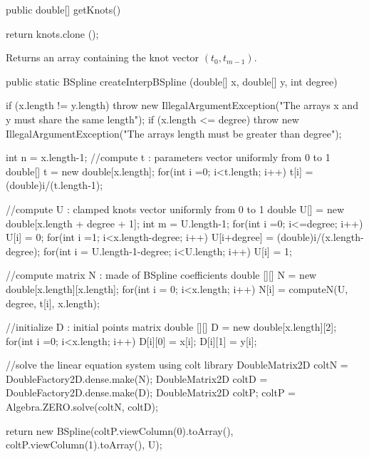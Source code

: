 \begin{code}

   public double[] getKnots()\begin{hide} {
      return knots.clone ();
   }\end{hide}
\end{code}
\begin{tabb}
   Returns an array containing the knot vector $(t_0, t_{m-1})$.
\end{tabb}
\begin{htmlonly}
\end{htmlonly}
\begin{code}

   public static BSpline createInterpBSpline (double[] x, double[] y,
                                              int degree) \begin{hide} {
      if (x.length != y.length)
         throw new IllegalArgumentException("The arrays x and y must share the same length");
      if (x.length <= degree)
         throw new IllegalArgumentException("The arrays length must be greater than degree");

      int n = x.length-1;
      //compute t : parameters vector uniformly from 0 to 1
      double[] t = new double[x.length];
      for(int i =0; i<t.length; i++) {
         t[i] = (double)i/(t.length-1);
      }

      //compute U : clamped knots vector uniformly from 0 to 1
      double U[] = new double[x.length + degree + 1];
      int m = U.length-1;
      for(int i =0; i<=degree; i++)
         U[i] = 0;
      for(int i =1; i<x.length-degree; i++)
         U[i+degree] = (double)i/(x.length-degree);
      for(int i = U.length-1-degree; i<U.length; i++)
         U[i] = 1;


      //compute matrix N : made of BSpline coefficients
      double [][] N = new double[x.length][x.length];
      for(int i = 0; i<x.length; i++) {
            N[i] = computeN(U, degree, t[i], x.length);
      }

      //initialize D : initial points matrix
      double [][] D = new double[x.length][2];
      for(int i =0; i<x.length; i++) {
         D[i][0] = x[i];
         D[i][1] = y[i];
      }

      //solve the linear equation system using colt library
      DoubleMatrix2D coltN = DoubleFactory2D.dense.make(N);
      DoubleMatrix2D coltD = DoubleFactory2D.dense.make(D);
      DoubleMatrix2D coltP;
      coltP = Algebra.ZERO.solve(coltN, coltD);

      return new BSpline(coltP.viewColumn(0).toArray(), coltP.viewColumn(1).toArray(), U);
   }\end{hide}
\end{code}
